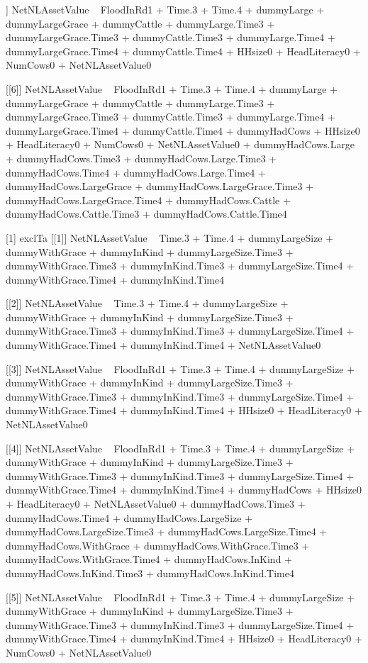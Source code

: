 \begin{Schunk}
\begin{Soutput}
[[5]]
NetNLAssetValue ~ FloodInRd1 + Time.3 + Time.4 + dummyLarge + 
    dummyLargeGrace + dummyCattle + dummyLarge.Time3 + dummyLargeGrace.Time3 + 
    dummyCattle.Time3 + dummyLarge.Time4 + dummyLargeGrace.Time4 + 
    dummyCattle.Time4 + HHsize0 + HeadLiteracy0 + NumCows0 + 
    NetNLAssetValue0

[[6]]
NetNLAssetValue ~ FloodInRd1 + Time.3 + Time.4 + dummyLarge + 
    dummyLargeGrace + dummyCattle + dummyLarge.Time3 + dummyLargeGrace.Time3 + 
    dummyCattle.Time3 + dummyLarge.Time4 + dummyLargeGrace.Time4 + 
    dummyCattle.Time4 + dummyHadCows + HHsize0 + HeadLiteracy0 + 
    NumCows0 + NetNLAssetValue0 + dummyHadCows.Large + dummyHadCows.Time3 + 
    dummyHadCows.Large.Time3 + dummyHadCows.Time4 + dummyHadCows.Large.Time4 + 
    dummyHadCows.LargeGrace + dummyHadCows.LargeGrace.Time3 + 
    dummyHadCows.LargeGrace.Time4 + dummyHadCows.Cattle + dummyHadCows.Cattle.Time3 + 
    dummyHadCows.Cattle.Time4

[1] exclTa
[[1]]
NetNLAssetValue ~ Time.3 + Time.4 + dummyLargeSize + dummyWithGrace + 
    dummyInKind + dummyLargeSize.Time3 + dummyWithGrace.Time3 + 
    dummyInKind.Time3 + dummyLargeSize.Time4 + dummyWithGrace.Time4 + 
    dummyInKind.Time4

[[2]]
NetNLAssetValue ~ Time.3 + Time.4 + dummyLargeSize + dummyWithGrace + 
    dummyInKind + dummyLargeSize.Time3 + dummyWithGrace.Time3 + 
    dummyInKind.Time3 + dummyLargeSize.Time4 + dummyWithGrace.Time4 + 
    dummyInKind.Time4 + NetNLAssetValue0

[[3]]
NetNLAssetValue ~ FloodInRd1 + Time.3 + Time.4 + dummyLargeSize + 
    dummyWithGrace + dummyInKind + dummyLargeSize.Time3 + dummyWithGrace.Time3 + 
    dummyInKind.Time3 + dummyLargeSize.Time4 + dummyWithGrace.Time4 + 
    dummyInKind.Time4 + HHsize0 + HeadLiteracy0 + NetNLAssetValue0

[[4]]
NetNLAssetValue ~ FloodInRd1 + Time.3 + Time.4 + dummyLargeSize + 
    dummyWithGrace + dummyInKind + dummyLargeSize.Time3 + dummyWithGrace.Time3 + 
    dummyInKind.Time3 + dummyLargeSize.Time4 + dummyWithGrace.Time4 + 
    dummyInKind.Time4 + dummyHadCows + HHsize0 + HeadLiteracy0 + 
    NetNLAssetValue0 + dummyHadCows.Time3 + dummyHadCows.Time4 + 
    dummyHadCows.LargeSize + dummyHadCows.LargeSize.Time3 + dummyHadCows.LargeSize.Time4 + 
    dummyHadCows.WithGrace + dummyHadCows.WithGrace.Time3 + dummyHadCows.WithGrace.Time4 + 
    dummyHadCows.InKind + dummyHadCows.InKind.Time3 + dummyHadCows.InKind.Time4

[[5]]
NetNLAssetValue ~ FloodInRd1 + Time.3 + Time.4 + dummyLargeSize + 
    dummyWithGrace + dummyInKind + dummyLargeSize.Time3 + dummyWithGrace.Time3 + 
    dummyInKind.Time3 + dummyLargeSize.Time4 + dummyWithGrace.Time4 + 
    dummyInKind.Time4 + HHsize0 + HeadLiteracy0 + NumCows0 + 
    NetNLAssetValue0


\end{Soutput}
\end{Schunk}
